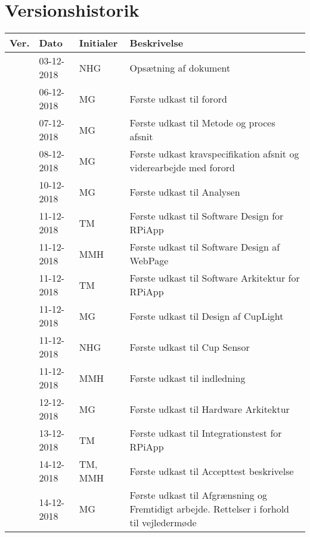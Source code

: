 \documentclass[Rapport/Rapport_main.tex]{subfiles}
\begin{document}
\section{Versionshistorik}
\begin{longtable}{|L{0.07\textwidth}|L{0.15\textwidth}|L{0.13\textwidth}|L{0.55\textwidth}|}
        \hline
        \textbf{Ver.} & \textbf{Dato} & \textbf{Initialer} & \textbf{Beskrivelse}  \\ \hline
        & 03-12-2018 & NHG & Opsætning af dokument \\ \hline
        & 06-12-2018 & MG & Første udkast til forord \\ \hline
        & 07-12-2018 & MG & Første udkast til Metode og proces afsnit \\ \hline
        & 08-12-2018 & MG & Første udkast kravspecifikation afsnit og viderearbejde med forord \\ \hline
        & 10-12-2018 & MG & Første udkast til Analysen \\ \hline
        & 11-12-2018 & TM & Første udkast til Software Design for RPiApp \\ \hline
        & 11-12-2018 & MMH & Første udkast til Software Design af WebPage \\ \hline
        & 11-12-2018 & TM & Første udkast til Software Arkitektur for RPiApp \\ \hline 
        & 11-12-2018 & MG & Første udkast til Design af CupLight \\ \hline 
        & 11-12-2018 & NHG & Første udkast til Cup Sensor \\ \hline
        & 11-12-2018 & MMH & Første udkast til indledning \\ \hline
        & 12-12-2018 & MG & Første udkast til Hardware Arkitektur \\ \hline
        & 13-12-2018 & TM & Første udkast til Integrationstest for RPiApp \\\hline
        & 14-12-2018 & TM, MMH & Første udkast til Accepttest beskrivelse \\ \hline
        & 14-12-2018 & MG & Første udkast til Afgrænsning og Fremtidigt arbejde. Rettelser i forhold til vejledermøde \\ \hline
\end{longtable}
\end{document}
